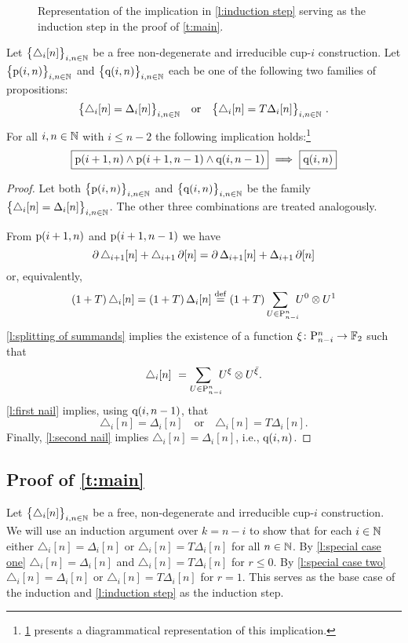 \begin{figure}
	\centering
	
	\caption{Representation of the implication in \cref{l:induction step} serving as the induction step in the proof of \cref{t:main}.}
	\label{f:induction step}
\end{figure}

\begin{lemma} \label{l:induction step}
	Let $\big\{ \triangle_i [n] \big\}_{i,n\in\mathbb{N}}$ be a free non-degenerate and irreducible \mbox{cup-$i$} construction.
	Let $\big\{ \mathrm{p}(i,n) \big\}_{i,n \in \mathbb{N}}$ and $\big\{ \mathrm{q}(i,n) \big\}_{i,n \in \mathbb{N}}$ each be one of the following two families of propositions:
	\[
	\big\{ \triangle_i [n] = \Delta_ i [n] \big\}_{i,n \in \N}
	\quad \text{or} \quad
	\big\{ \triangle_i [n] = T \Delta_ i [n] \big\}_{i,n \in \N} \ .
	\]
	For all $i,n \in \mathbb{N}$ with $i \leq n-2$ the following implication holds:\footnote{\cref{f:induction step} presents a diagrammatical representation of this implication.}
	\[
	\boxed{\mathrm{p}(i+1,n) \wedge \mathrm{p}(i+1,n-1) \wedge \mathrm{q}(i,n-1)}\ \Longrightarrow\ \boxed{\mathrm{q}(i,n)}
	\]
\end{lemma}

\begin{proof}
	Let both $\big\{ \mathrm{p}(i,n) \big\}_{i,n\in\mathbb{N}}$ and $\big\{ \mathrm{q}(i,n) \big\}_{i,n\in\mathbb{N}}$ be the family $\big\{ \triangle_i [n] = \Delta_i [n] \big\}_{i,n \in \mathbb{N}}$.
	The other three combinations are treated analogously.

	From $\mathrm{p}(i+1,n)$ and $\mathrm{p}(i+1,n-1)$ we have
	\[
	\operatorname{\partial} \triangle_{i+1} [n] + \triangle_{i+1} \operatorname{\partial} [n] = \operatorname{\partial} \Delta_{i+1} [n] + \Delta_{i+1} \operatorname{\partial} [n]
	\]
	or, equivalently,
	\begin{align*}
	(1+T) \, \triangle_i [n] =
	(1+T) \, \Delta_i [n] \stackrel{\mathrm{def}}{=}
	(1+T) \sum_{U \in \mathrm{P}_{n-i}^n \kern-5pt} {U^0} \otimes {U^1}
	\end{align*}
	\cref{l:splitting of summands} implies the existence of a function $\xi \colon \mathrm{P}_{n-i}^n \to {\mathbb{F}_2}$ such that
	\[
	\triangle_i [n] \ =
	\sum_{U \in \mathrm{P}_{n-i}^n \kern-5pt} U^\xi \otimes U^{\bar{\xi}}.
	\]
	\cref{l:first nail} implies, using $\mathrm{q}(i,n-1)$, that
	\[
	\triangle_i [n] = \Delta_i [n]
	\quad \text{or} \quad
	\triangle_i [n] = T \Delta_i [n].
	\]
	Finally, \cref{l:second nail} implies $\triangle_i [n] = \Delta_i [n]$, i.e., $\mathrm{q}(i,n)$.
\end{proof}

\subsection{Proof of \cref{t:main}} \label{ss:proof}

Let $\big\{ \triangle_i [n] \big\}_{i,n\in\mathbb{N}}$ be a free, non-degenerate and irreducible \mbox{cup-$i$} construction.
We will use an induction argument over $k = n-i$ to show that for each $i \in \mathbb{N}$ either $\triangle_i [n] = \Delta_i [n]$ or
$\triangle_i [n] = T \Delta_i [n]$ for all $n \in \mathbb{N}$.
By \cref{l:special case one} $\triangle_i [n] = \Delta_i [n]$ and $\triangle_i [n] = T \Delta_i [n]$ for $r \leq 0$.
By \cref{l:special case two} $\triangle_i [n] = \Delta_i [n]$ or $\triangle_i [n] = T \Delta_i [n]$ for $r = 1$.
This serves as the base case of the induction and \cref{l:induction step} as the induction step.